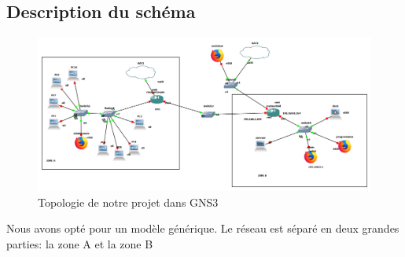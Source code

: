 \documentclass[a4paper,12pt,french]{report} %
\begin{document}
\subsection{Description du schéma}
\begin{figure}[H]
\includegraphics[width=19cm]{figure/topologie_gns3.png}
\centering
\caption{Topologie de notre projet dans GNS3}	
\end{figure}	
Nous avons opté pour un modèle générique. Le réseau est séparé en deux grandes parties: la zone A et la zone B
\end{document}
